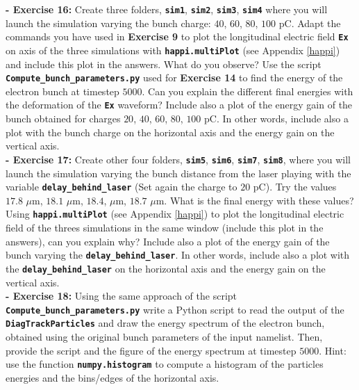 \documentclass[a4paper,12pt]{extarticle}
\newcommand{\commandline}[1]{\texttt{\textbf{#1}}}
\begin{document}
\textbf{ - Exercise 16:} Create three folders, \commandline{sim1}, \commandline{sim2}, \commandline{sim3}, \commandline{sim4} where you will launch the simulation varying the bunch charge: $40$, $60$, $80$, $100$ pC. Adapt the commands you have used in \textbf{Exercise 9} to plot the longitudinal electric field \commandline{Ex} on axis of the three simulations with \commandline{happi.multiPlot} (see Appendix \ref{happi}) and include this plot in the answers. What do you observe? Use the script \commandline{Compute\_bunch\_parameters.py} used for \textbf{Exercise 14} to find the energy of the electron bunch at timestep $5000$. Can you explain the different final energies with the deformation of the \commandline{Ex} waveform? Include also a plot of the energy gain of the bunch obtained for charges $20$, $40$, $60$, $80$, $100$ pC. In other words, include also a plot with the bunch charge on the horizontal axis and the energy gain on the vertical axis.\\

\textbf{ - Exercise 17:} Create other four folders, \commandline{sim5}, \commandline{sim6}, \commandline{sim7},  \commandline{sim8}, where you will launch the simulation varying the bunch distance from the laser playing with the variable \commandline{delay\_behind\_laser} (Set again the charge to $20$ pC). Try the values $17.8$ $\mu$m, $18.1$ $\mu$m, $18.4$, $\mu$m, $18.7$ $\mu$m. What is the final energy with these values? Using \commandline{happi.multiPlot} (see Appendix \ref{happi}) to plot the longitudinal electric field of the threes simulations in the same window (include this plot in the answers), can you explain why? Include also a plot of the energy gain of the bunch varying the \commandline{delay\_behind\_laser}. In other words, include also a plot with the \commandline{delay\_behind\_laser} on the horizontal axis and the energy gain on the vertical axis.\\

\textbf{- Exercise 18:} Using the same approach of the script \commandline{Compute\_bunch\_parameters.py} write a Python script to read the output of the \commandline{DiagTrackParticles} and draw the energy spectrum of the electron bunch, obtained using the original bunch parameters of the input namelist. Then, provide the script and the figure of the energy spectrum at timestep $5000$. Hint: use the function \commandline{numpy.histogram} to compute a histogram of the particles energies and the bins/edges of the horizontal axis.\\
\end{document}
